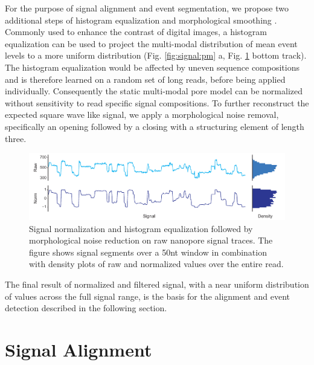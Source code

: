 For the purpose of signal alignment and event segmentation, we propose two additional steps of  histogram equalization and morphological smoothing \cite{Gonzalez2006}. Commonly used to enhance the contrast of digital images, a histogram equalization can be used to project the multi-modal distribution of mean event levels to a more uniform distribution (Fig. \ref{fig:signal:pm} a, Fig. \ref{fig:signal:normalization} bottom track).
The histogram equalization would be affected by uneven sequence compositions and is therefore learned on a random set of long reads, before being applied individually.
Consequently the static multi-modal pore model can be normalized without sensitivity to read specific signal compositions.
To further reconstruct the expected square wave like signal, we apply a morphological noise removal, specifically an opening followed by a closing with a structuring element of length three.

\begin{figure}[h]
	\centering
	\includegraphics[width=1.0\textwidth]{figures/signal/normalization.pdf}
	\captionsetup{format=plain}
	\caption[Signal normalization and histogram equalization]{Signal normalization and histogram equalization followed by morphological noise reduction on raw nanopore signal traces. The figure shows signal segments over a 50nt window in combination with density plots of raw and normalized values over the entire read.}
	\label{fig:signal:normalization}
\end{figure}

The final result of normalized and filtered signal, with a near uniform distribution of values across the full signal range, is the basis for the alignment and event detection described in the following section.




\section{Signal Alignment}
\label{sec:signal:alignment}

